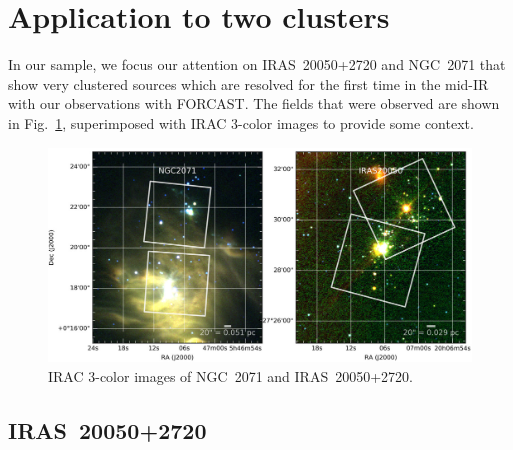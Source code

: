\section{Application to two clusters}

In our sample, we focus our attention on IRAS~20050+2720 and NGC~2071 that show very clustered sources which are resolved for the first time in the mid-IR with our observations with FORCAST. The fields that were observed are shown in Fig.~\ref{fig:NGC2071_IRAS20050_RGB}, superimposed with IRAC 3-color images to provide some context.

\begin{landscape}
\begin{figure}
\begin{center}
\includegraphics[width=1.55\textwidth]{Figures/NGC2071_IRAS20050_RGB.jpg}

\caption[NGC~2071 and IRAS~20050+2720]{IRAC 3-color images of NGC~2071 and IRAS~20050+2720.}
\label{fig:NGC2071_IRAS20050_RGB}
\end{center}
\end{figure}
\end{landscape}




\subsection{IRAS~20050+2720}
\label{sec:IRAS}

